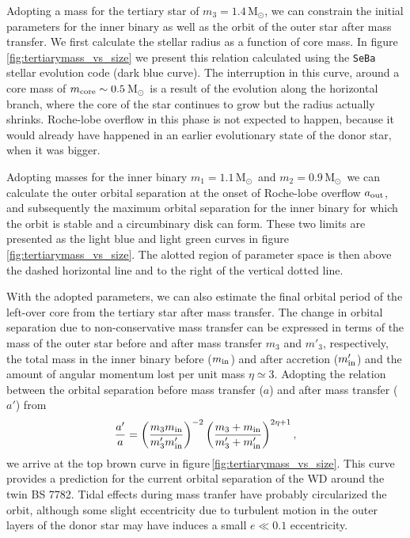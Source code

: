 \documentclass{aastex62}
\newcommand{\MSun}{\mbox{M$_\odot$}}
\begin{document}
Adopting a mass for the tertiary star of $m_3 = 1.4$\,\MSun, we
can constrain the initial parameters for the inner binary as well as
the orbit of the outer star after mass transfer. We first calculate
the stellar radius as a function of core mass. In
figure\,\ref{fig:tertiarymass_vs_size} we present this relation
calculated using the {\tt SeBa} stellar evolution code
\cite{1996A&A...309..179P} (dark blue curve).  The interruption in
this curve, around a core mass of $m_{\rm core} \sim 0.5$\,\MSun\, is
a result of the evolution along the horizontal branch, where the core
of the star continues to grow but the radius actually shrinks.
Roche-lobe overflow in this phase is not expected to happen, because
it would already have happened in an earlier evolutionary state of the
donor star, when it was bigger.

Adopting masses for the inner binary $m_1=1.1$\,\MSun\, and
$m_2=0.9$\,\MSun\, we can calculate the outer orbital separation at
the onset of Roche-lobe overflow $a_{\rm out}$, and subsequently the
maximum orbital separation for the inner binary for which the orbit is
stable and a circumbinary disk can form. These two limits are
presented as the light blue and light green curves in
figure\,\ref{fig:tertiarymass_vs_size}.  The alotted region of
parameter space is then above the dashed horizontal line and to the
right of the vertical dotted line.

With the adopted parameters, we can also estimate the final orbital
period of the left-over core from the tertiary star after 
mass transfer.  The change in orbital separation due to
non-conservative mass transfer can be expressed in terms of the mass
of the outer star before and after mass transfer $m_3$ and $m'_3$,
respectively, the total mass in the inner binary before ($m_{\rm in}$)
and after accretion ($m'_{\rm in}$) and the amount of angular momentum
lost per unit mass $\eta \simeq 3$. Adopting the relation between the
orbital separation before mass transfer ($a$) and after mass transfer
($a'$) from \cite{1995A&A...296..691P}
\begin{equation}
  {a' \over a} = \left( {m_3 m_{\rm in} \over m'_3 m'_{\rm in}} \right)^{-2}
  \left( {m_3 + m_{\rm in} \over m'_3 + m'_{\rm in}} \right)^{2\eta + 1},
\end{equation}
we arrive at the top brown curve in
figure\,\ref{fig:tertiarymass_vs_size}. This curve provides a prediction for 
the current orbital separation of the WD around the twin
BS 7782. Tidal effects during mass tranfer
have probably circularized the orbit, although some slight eccentricity
due to turbulent motion in the outer layers of the donor star may have
induces a small $e \ll 0.1$ eccentricity.
\end{document}
